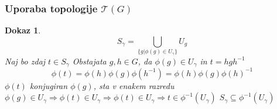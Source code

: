 \documentclass{beamer}
\newtheorem{dokaz}{Dokaz}
\begin{document}
\begin{frame}
\frametitle{Uporaba topologije $\mathcal{T}(G)$}

\begin{dokaz}
    \[ S_\gamma = \bigcup_{\{g | \phi(g) \in U_\gamma\}} U_g \]
    \pause
    Naj bo zdaj $t \in S_\gamma$
    \newline
    \pause
    Obstajata $g,h \in G$, da $\phi(g) \in U_\gamma$ in $t = hgh^{-1}$
    \pause
    \[\phi(t) = \phi(h)\phi(g)\phi(h^{-1}) = \phi(h)\phi(g)\phi(h)^{-1}\]
    \pause
    $\phi(t)$ konjugiran $\phi(g)$, sta v enakem razredu
    \newline
    \pause
    $\phi(g) \in U_\gamma \Rightarrow \phi(t) \in U_\gamma \Rightarrow \phi(t) \in U_\gamma \Rightarrow t \in \phi^{-1}(U_\gamma)$
    \newline
    \pause
    {\color{red} $S_\gamma \subseteq \phi^{-1}(U_\gamma)$}

\end{dokaz}
\end{frame}




\end{document}
